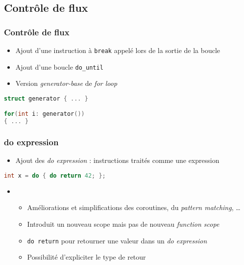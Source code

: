 \documentclass[C++.tex]{subfiles}
\begin{document}
\subsection*{Contrôle de flux}
\begin{frame}[fragile]
	\frametitle{Contrôle de flux}
	\begin{itemize}
		\item Ajout d'une instruction à \lstinline|break| appelé lors de la sortie de la boucle


		\item Ajout d'une boucle \lstinline|do_until|
		\item Version \textit{generator-base} de \textit{for loop}
	\end{itemize}

	\begin{lstlisting}[language=C++]
struct generator { ... }

for(int i: generator())
{ ... }\end{lstlisting}
\end{frame}

\begin{frame}[fragile]
	\frametitle{do expression}
	\begin{itemize}
		\item Ajout des \og{}\textit{do expression}\fg{} : instructions traités comme une expression
	\end{itemize}

	\begin{lstlisting}[language=C++]
int x = do { do return 42; };\end{lstlisting}

	\begin{itemize}
		\item[]
		\begin{itemize}
			\item Améliorations et simplifications des coroutines, du \textit{pattern matching}, \ldots{}
			\item Introduit un nouveau scope mais pas de nouveau \textit{function scope}
			\item \lstinline|do return| pour retourner une valeur dans un \textit{do expression}
			\item Possibilité d'expliciter le type de retour
		\end{itemize}
	\end{itemize}
\end{frame}
\end{document}
